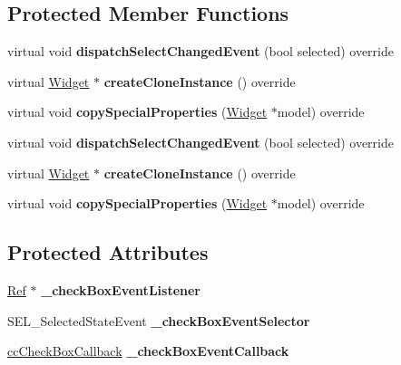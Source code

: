 \subsection*{Protected Member Functions}
\begin{DoxyCompactItemize}
\item 
\mbox{\label{classui_1_1CheckBox_affb521c7117d197601168ef6f804a6f1}} 
virtual void {\bfseries dispatch\+Select\+Changed\+Event} (bool selected) override
\item 
\mbox{\label{classui_1_1CheckBox_a598a4049241f6acef88e183227d143f0}} 
virtual \hyperlink{classui_1_1Widget}{Widget} $\ast$ {\bfseries create\+Clone\+Instance} () override
\item 
\mbox{\label{classui_1_1CheckBox_a363e29b5c0a7a85ab8bf5ae47cce77d8}} 
virtual void {\bfseries copy\+Special\+Properties} (\hyperlink{classui_1_1Widget}{Widget} $\ast$model) override
\item 
\mbox{\label{classui_1_1CheckBox_a0e8b68ec31115168ec7e12ad7cb53fec}} 
virtual void {\bfseries dispatch\+Select\+Changed\+Event} (bool selected) override
\item 
\mbox{\label{classui_1_1CheckBox_a1f784aea3f68b1ca42eab8053a1d9e32}} 
virtual \hyperlink{classui_1_1Widget}{Widget} $\ast$ {\bfseries create\+Clone\+Instance} () override
\item 
\mbox{\label{classui_1_1CheckBox_ad093c10e3d1c7521a5797b370ccdfe8b}} 
virtual void {\bfseries copy\+Special\+Properties} (\hyperlink{classui_1_1Widget}{Widget} $\ast$model) override
\end{DoxyCompactItemize}
\subsection*{Protected Attributes}
\begin{DoxyCompactItemize}
\item 
\mbox{\label{classui_1_1CheckBox_a32232216bd436aa9faebe833d82dfa65}} 
\hyperlink{classRef}{Ref} $\ast$ {\bfseries \+\_\+check\+Box\+Event\+Listener}
\item 
\mbox{\label{classui_1_1CheckBox_a6bcabd646cf75f56140ff0e44405d20b}} 
S\+E\+L\+\_\+\+Selected\+State\+Event {\bfseries \+\_\+check\+Box\+Event\+Selector}
\item 
\mbox{\label{classui_1_1CheckBox_aab6ace54e76ace6e9037c1ef684aa28d}} 
\hyperlink{classui_1_1CheckBox_ad210762967d1b444f5cf94f5e7450c56}{cc\+Check\+Box\+Callback} {\bfseries \+\_\+check\+Box\+Event\+Callback}
\end{DoxyCompactItemize}
